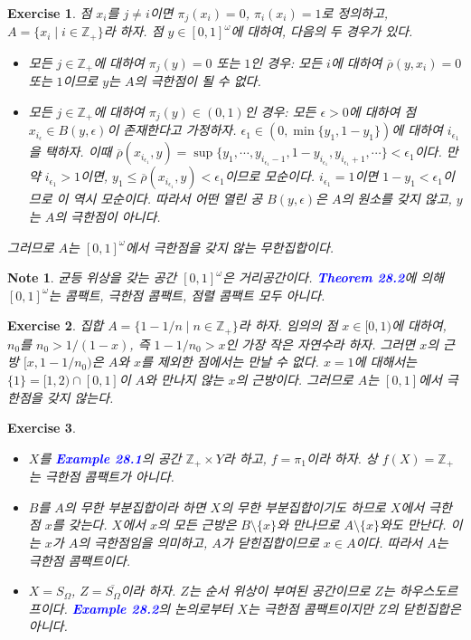 \documentclass{article}
\newtheorem{exercise}{Exercise}[section]
\newtheorem*{note}{Note}
\newcommand{\Z}{\mathbb{Z}}
\begin{document}
\begin{exercise}
	\label{exc:28.1}
    점 $x_i$를 $j\ne i$이면 $\pi_j(x_i)=0$, $\pi_i(x_i)=1$로 정의하고, $A=\{x_i\mid i\in\Z_+\}$라 하자. 점 $y\in[0,1]^\omega$에 대하여, 다음의 두 경우가 있다.
    \begin{itemize}
        \item[(i)] 모든 $j\in\Z_+$에 대하여 $\pi_j(y)=0$ 또는 $1$인 경우: 모든 $i$에 대하여 $\overline{\rho}(y,x_i)=0$ 또는 $1$이므로 $y$는 $A$의 극한점이 될 수 없다.
        \item[(ii)] 모든 $j\in\Z_+$에 대하여 $\pi_j(y)\in(0,1)$인 경우: 모든 $\epsilon>0$에 대하여 점 $x_{i_\epsilon}\in B(y,\epsilon)$이 존재한다고 가정하자. $\epsilon_1\in(0,\min\{y_1,1-y_1\})$에 대하여 $i_{\epsilon_1}$을 택하자. 이때 $\overline{\rho}(x_{i_{\epsilon_1}},y)=\sup\{y_1,\cdots,y_{i_{\epsilon_1}-1},1-y_{i_{\epsilon_1}},y_{i_{\epsilon_1}+1},\cdots\}<\epsilon_1$이다. 만약 $i_{\epsilon_1}>1$이면, $y_1\leq\overline{\rho}(x_{i_{\epsilon_1}},y)<\epsilon_1$이므로 모순이다. $i_{\epsilon_1}=1$이면 $1-y_1<\epsilon_1$이므로 이 역시 모순이다. 따라서 어떤 열린 공 $B(y,\epsilon)$은 $A$의 원소를 갖지 않고, $y$는 $A$의 극한점이 아니다.
    \end{itemize}
    그러므로 $A$는 $[0,1]^\omega$에서 극한점을 갖지 않는 무한집합이다.
\end{exercise}
\begin{note}
    균등 위상을 갖는 공간 $[0,1]^\omega$은 거리공간이다. \textcolor{blue}{\textbf{Theorem 28.2}}에 의해 $[0,1]^\omega$는 콤팩트, 극한점 콤팩트, 점렬 콤팩트 모두 아니다.
\end{note}

\begin{exercise}
    집합 $A=\{1-1/n\mid n\in\Z_+\}$라 하자. 임의의 점 $x\in[0,1)$에 대하여, $n_0$를 $n_0>1/(1-x)$, 즉 $1-1/n_0>x$인 가장 작은 자연수라 하자. 그러면 $x$의 근방 $[x,1-1/n_0)$은 $A$와 $x$를 제외한 점에서는 만날 수 없다. $x=1$에 대해서는 $\{1\}=[1,2)\cap [0,1]$이 $A$와 만나지 않는 $x$의 근방이다. 그러므로 $A$는 $[0,1]$에서 극한점을 갖지 않는다.
\end{exercise}

\begin{exercise}
    \phantom{}
    \begin{itemize}
        \item[(a)] $X$를 \textcolor{blue}{\textbf{Example 28.1}}의 공간 $\Z_+\times Y$라 하고, $f=\pi_1$이라 하자. 상 $f(X)=\Z_+$는 극한점 콤팩트가 아니다.
        \item[(b)] $B$를 $A$의 무한 부분집합이라 하면 $X$의 무한 부분집합이기도 하므로 $X$에서 극한점 $x$를 갖는다. $X$에서 $x$의 모든 근방은 $B\setminus\{x\}$와 만나므로 $A\setminus\{x\}$와도 만난다. 이는 $x$가 $A$의 극한점임을 의미하고, $A$가 닫힌집합이므로 $x\in A$이다. 따라서 $A$는 극한점 콤팩트이다.
        \item[(c)] $X=S_{\Omega}$, $Z=\overline{S_{\Omega}}$이라 하자. $Z$는 순서 위상이 부여된 공간이므로 $Z$는 하우스도르프이다. \textcolor{blue}{\textbf{Example 28.2}}의 논의로부터 $X$는 극한점 콤팩트이지만 $Z$의 닫힌집합은 아니다.
    \end{itemize}
\end{exercise}
\end{document}
